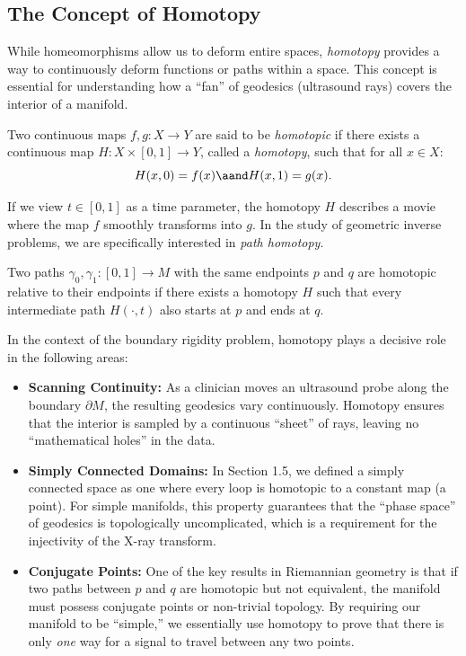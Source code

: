 \subsection{The Concept of Homotopy} While homeomorphisms allow us to deform entire spaces, \emph{homotopy} provides a way to continuously deform functions or paths within a space. This concept is essential for understanding how a ``fan'' of geodesics (ultrasound rays) covers the interior of a manifold.

\begin{definition}
  Two continuous maps $f, g: X \to Y$ are said to be \emph{homotopic} if there exists a continuous map $H: X \times [0, 1] \to Y$, called a \emph{homotopy}, such that for all $x \in X$:
  \[%
    H(x, 0) = f(x) \aand H(x, 1) = g(x)
  .\]%
\end{definition}

If we view $t \in [0, 1]$ as a time parameter, the homotopy $H$ describes a movie where the map $f$ smoothly transforms into $g$. In the study of geometric inverse problems, we are specifically interested in \emph{path homotopy}.

\begin{definition}
  Two paths $\gamma_0, \gamma_1 : [0, 1] \to M$ with the same endpoints $p$ and $q$ are homotopic relative to their endpoints if there exists a homotopy $H$ such that every intermediate path $H(\cdot, t)$ also starts at $p$ and ends at $q$.
\end{definition}

In the context of the boundary rigidity problem, homotopy plays a decisive role in the following areas:
\begin{itemize}
  \item \textbf{Scanning Continuity:} As a clinician moves an ultrasound probe along the boundary $\partial M$, the resulting geodesics vary continuously. Homotopy ensures that the interior is sampled by a continuous ``sheet'' of rays, leaving no ``mathematical holes'' in the data.
  \item \textbf{Simply Connected Domains:} In Section 1.5, we defined a simply connected space as one where every loop is homotopic to a constant map (a point). For simple manifolds, this property guarantees that the ``phase space'' of geodesics is topologically uncomplicated, which is a requirement for the injectivity of the X-ray transform.
  \item \textbf{Conjugate Points:} One of the key results in Riemannian geometry is that if two paths between $p$ and $q$ are homotopic but not equivalent, the manifold must possess conjugate points or non-trivial topology. By requiring our manifold to be ``simple,'' we essentially use homotopy to prove that there is only \emph{one} way for a signal to travel between any two points.
\end{itemize}


